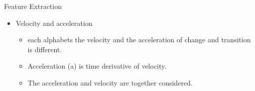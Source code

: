 \documentclass{beamer}
\begin{document}
%

\begin{frame}{Feature Extraction}
\begin{itemize}
\item Velocity and acceleration
\begin{itemize}
\item each alphabets the
velocity and the acceleration of change and transition is different.
\linebreak
\item Acceleration (a) is time derivative of velocity.
\linebreak
\item The acceleration and velocity are together considered. 
\end{itemize}
\end{itemize}
\end{frame}
\end{document}
